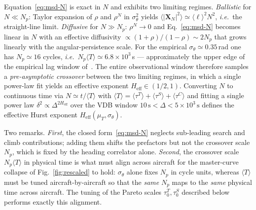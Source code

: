 \documentclass[10pt,twocolumn,a4paper]{article}
\begin{document}
Equation~\eqref{eq:msd-N} is exact in $N$ and exhibits two
limiting regimes. \emph{Ballistic} for $N\ll N_p$: Taylor expansion
of $\rho$ and $\rho^N$ in $\sigma_\theta^2$ yields
$\langle|\mathbf{X}_N|^2\rangle\simeq\langle\ell\rangle^2 N^2$,
\emph{i.e.}\ the straight-line limit. \emph{Diffusive} for
$N\gg N_p$: $\rho^N\to 0$ and Eq.~\eqref{eq:msd-N} becomes linear
in $N$ with an effective diffusivity
$\propto (1+\rho)/(1-\rho)\sim 2N_p$ that grows linearly with the
angular-persistence scale. For the empirical
$\sigma_\theta\simeq 0.35$\,rad one has $N_p\simeq 16$ cycles,
\emph{i.e.}\ $N_p\langle T\rangle\simeq 6.8\times 10^3$\,s ---
approximately the upper edge of the empirical lag window
of~\cite{vilpellet2026}. The entire observational window therefore
samples a \emph{pre-asymptotic crossover} between the two limiting
regimes, in which a single power-law fit yields an effective
exponent $H_{\mathrm{eff}}\in(1/2,1)$. Converting $N$ to continuous
time via $N\simeq t/\langle T\rangle$ with
$\langle T\rangle=\langle\tau^T\rangle+\langle\tau^S\rangle+
\langle\tau^C\rangle$ and fitting a single power law
$\delta^2\propto\Delta^{2H_{\mathrm{eff}}}$ over the VDB window
$10\,\mathrm{s}<\Delta<5\times 10^3\,\mathrm{s}$ defines the
effective Hurst exponent $H_{\mathrm{eff}}(\mu_T,\sigma_\theta)$.

Two remarks. \emph{First}, the closed form~\eqref{eq:msd-N}
neglects sub-leading search and climb contributions; adding them
shifts the prefactors but not the crossover scale $N_p$, which is
fixed by the heading correlator alone. \emph{Second}, the
crossover scale $N_p\langle T\rangle$ in physical time is what must
align across aircraft for the master-curve collapse of
Fig.~\ref{fig:rescaled} to hold: $\sigma_\theta$ alone fixes $N_p$
in cycle units, whereas $\langle T\rangle$ must be tuned
aircraft-by-aircraft so that the \emph{same} $N_p$ maps to the
\emph{same} physical time across aircraft. The tuning of the
Pareto scales $\tau_0^T,\tau_0^S$ described below performs exactly
this alignment.
\end{document}
